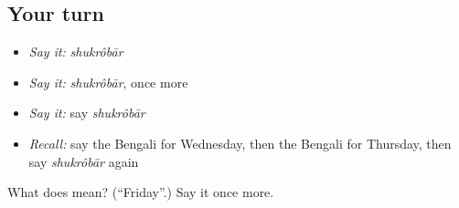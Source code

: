 \subsection*{Your turn}
\begin{itemize}
\raggedright
  \item \emph{Say it:} \emph{shukrôbār}
  \item \emph{Say it:} \emph{shukrôbār}, once more
  \item \emph{Say it:} say \emph{shukrôbār}
  \item \emph{Recall:} say the Bengali for Wednesday, then the Bengali for Thursday, then say \emph{shukrôbār} again
\end{itemize}

\begin{tcolorbox}[breakable,colback=teal!4,colframe=teal!35!black,title={Before you move on}]
What does  mean? (\textquotedblleft{}Friday\textquotedblright{}.) Say it once more.
\end{tcolorbox}
